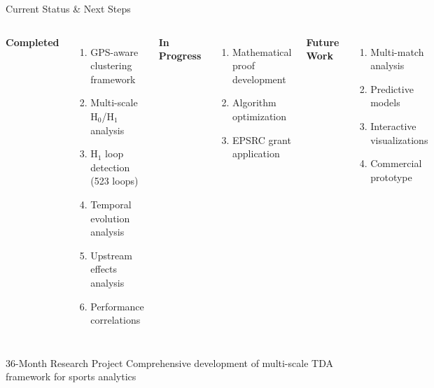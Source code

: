 \documentclass[aspectratio=169]{beamer}
\begin{document}
\begin{frame}{Current Status \& Next Steps}

\begin{columns}[T]
\textbf{\textcolor{secondarygreen}{\faCheckCircle} Completed}
\begin{enumerate}
    \item GPS-aware clustering framework
    \item Multi-scale H$_0$/H$_1$ analysis
    \item H$_1$ loop detection (523 loops)
    \item Temporal evolution analysis
    \item Upstream effects analysis
    \item Performance correlations
\end{enumerate}

\textbf{\textcolor{accentorange}{\faSync} In Progress}
\begin{enumerate}
    \item Mathematical proof development
    \item Algorithm optimization
    \item EPSRC grant application
\end{enumerate}

\vspace{0.3cm}
\textbf{\textcolor{primaryblue}{\faList} Future Work}
\begin{enumerate}
    \item Multi-match analysis
    \item Predictive models
    \item Interactive visualizations
    \item Commercial prototype
\end{enumerate}
\end{columns}

\vspace{0.3cm}
\begin{block}{36-Month Research Project}
Comprehensive development of multi-scale TDA framework for sports analytics
\end{block}
\end{frame}
\end{document}
